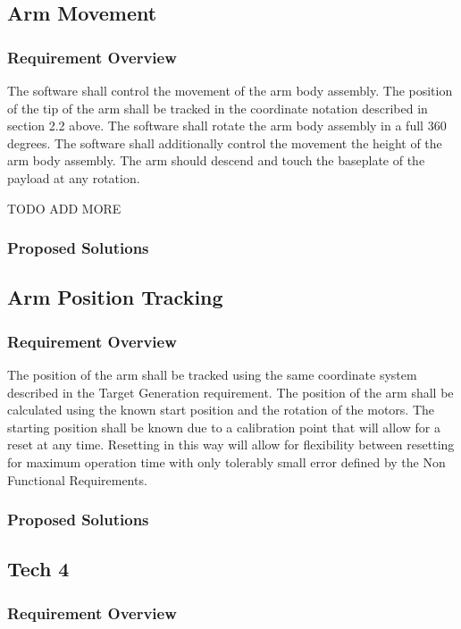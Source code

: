 \documentclass[letterpaper,10pt]{article}
\begin{document}
\subsection{Arm Movement}
\subsubsection{Requirement Overview}
The software shall control the movement of the arm body assembly. 
The position of the tip of the arm shall be tracked in the coordinate notation described in section 2.2 above.
The software shall rotate the arm body assembly in a full 360 degrees.
The software shall additionally control the movement the height of the arm body assembly.
The arm should descend and touch the baseplate of the payload at any rotation.

TODO ADD MORE
\subsubsection{Proposed Solutions}

\subsection{Arm Position Tracking}
\subsubsection{Requirement Overview}
The position of the arm shall be tracked using the same coordinate system described in the Target Generation requirement.
The position of the arm shall be calculated using the known start position and the rotation of the motors.
The starting position shall be known due to a calibration point that will allow for a reset at any time.
Resetting in this way will allow for flexibility between resetting for maximum operation time with only tolerably small error defined by the Non Functional Requirements.
\subsubsection{Proposed Solutions}

\subsection{Tech 4}
\subsubsection{Requirement Overview}
\end{document}
